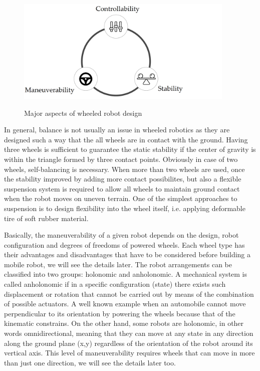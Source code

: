 \documentclass[12pt,english,twoside]{article}
\begin{document}
\begin{figure}[h]
	\centering
	\includegraphics[height=5cm]{figures/triangle.png}
	\label{triangle}
	\caption{Major aspects of wheeled robot design}
\end{figure}

In general, balance is not usually an issue in wheeled robotics as they are designed such a way that the all wheels are in contact with the ground. Having three wheels is sufficient to guarantee the static stability if the center of gravity is within the triangle formed by three contact points. Obviously in case of two wheels, self-balancing is necessary. When more than two wheels are used, once the stability improved by adding more contact possibilites, but also a flexible suspension system is required to allow all wheels to maintain ground contact when the robot moves on uneven terrain. One of the simplest approaches to suspension is to design flexibility into the wheel itself, i.e. applying deformable tire of soft rubber material.

Basically, the maneuverability of a given robot depends on the design, robot configuration and degrees of freedoms of powered wheels. Each wheel type has their advantages and disadvantages that have to be considered before building a mobile robot, we will see the details later. The robot arrangements can be classified into two groups: holonomic and anholonomic. A mechanical system is called anholonomic if in a specific configuration (state) there exists such displacement or rotation that cannot be carried out by means of the combination of possible actuators. A well known example when an automobile cannot move perpendicular to its orientation by powering the wheels because that of the kinematic constrains. On the other hand, some robots are holonomic, in other words omnidirectional, meaning that they can move at any state in any direction along the ground plane (x,y) regardless of the orientation of the robot around its vertical axis. This level of maneuverability requires wheels that can move in more than just one direction, we will see the details later too.
\end{document}

